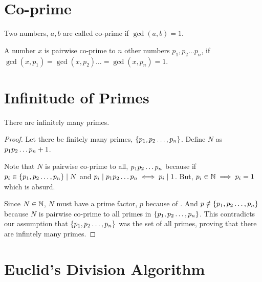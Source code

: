 \section{Co-prime}

\begin{definition}
    Two numbers, \(a, b\) are called co-prime if \(\gcd(a,b)=1\).
\end{definition}

\begin{definition}
    A number \(x\) is pairwise co-prime to \(n\) other numbers \(p_{1}, p_{2} \ldots p_{n}\), if \( \gcd(x, p_1) = \gcd(x, p_2) \ldots = \gcd(x, p_n) =1 \).
\end{definition}

\section{Infinitude of Primes}



\begin{theorem}
    [Euclid]
    There are infinitely many primes.
\end{theorem}

\begin{proof}
    Let there be finitely many primes, \(\{p_{1},p_{2}\ldots,p_{n}\}\). Define \( N \) as \( p_{1}p_{2}\ldots p_{n} + 1 \).
    \par
    Note that \(N\) is pairwise co-prime to all, \(p_{1}p_{2}\ldots p_{n}\) because if \(p_i \in \{p_{1},p_{2}\ldots,p_{n}\} \mid N \) 
    and \(p_i \mid p_{1}p_{2}\ldots p_{n} \iff p_i \mid 1\). But, \( p_i \in \mathbb N \implies p_i = 1 \) which is absurd.
    \\
    \par Since \(N \in \mathbb N\), \(N\) must have a prime factor, \(p\) because of . 
    And \(p \notin \{p_{1},p_{2}\ldots,p_{n}\}\) because \(N \) is pairwise co-prime to all primes in \(\{p_{1},p_{2}\ldots,p_{n}\}\). 
    This contradicts our assumption that \(\{p_{1},p_{2}\ldots,p_{n}\}\) was the set of all primes, 
    proving that there are infintely many primes.

\end{proof}


\section{Euclid's Division Algorithm}

